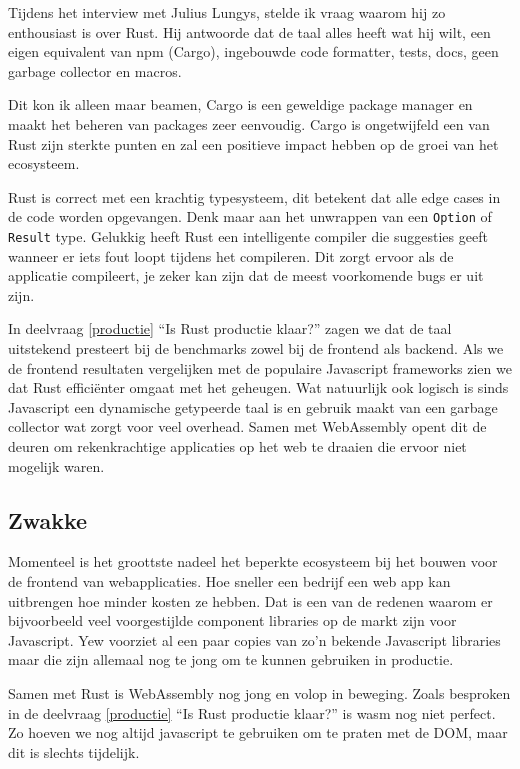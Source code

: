 Tijdens het interview met Julius Lungys, stelde ik vraag waarom hij zo enthousiast is over Rust. 
Hij antwoorde dat de taal alles heeft wat hij wilt, een eigen equivalent van npm (Cargo), ingebouwde
code formatter, tests, docs, geen garbage collector en macros.

Dit kon ik alleen maar beamen, Cargo is een geweldige package manager en maakt het beheren van
packages zeer eenvoudig. Cargo is ongetwijfeld een van Rust zijn sterkte punten en zal een positieve
impact hebben op de groei van het ecosysteem.

Rust is correct met een krachtig typesysteem, dit betekent dat alle edge cases in de code worden
opgevangen. Denk maar aan het unwrappen van een \texttt{Option} of
\texttt{Result} type. Gelukkig heeft Rust een intelligente compiler die suggesties geeft
wanneer er iets fout loopt tijdens het compileren. Dit zorgt ervoor als de applicatie compileert, je
zeker kan zijn dat de meest voorkomende bugs er uit zijn.

In deelvraag \ref{productie} \enquote{Is Rust productie klaar?} zagen we dat de taal uitstekend
presteert bij de benchmarks zowel bij de frontend als backend. Als we de frontend resultaten
vergelijken met de populaire Javascript frameworks zien we dat Rust efficiënter omgaat met het
geheugen. Wat natuurlijk ook logisch is sinds Javascript een dynamische getypeerde taal is en
gebruik maakt van een garbage collector wat zorgt voor veel overhead. Samen met WebAssembly opent
dit de deuren om rekenkrachtige applicaties op het web te draaien die ervoor niet mogelijk waren.

\subsection{Zwakke}

Momenteel is het groottste nadeel het beperkte ecosysteem bij het bouwen voor de frontend van
webapplicaties. Hoe sneller een bedrijf een web app kan uitbrengen hoe minder kosten ze hebben. Dat
is een van de redenen waarom er bijvoorbeeld veel voorgestijlde component libraries op de markt zijn
voor Javascript. Yew voorziet al een paar copies van zo'n bekende Javascript libraries maar die zijn
allemaal nog te jong om te kunnen gebruiken in productie.

Samen met Rust is WebAssembly nog jong en volop in beweging. Zoals besproken in de deelvraag
\ref{productie} \enquote{Is Rust productie klaar?} is wasm nog niet perfect. Zo hoeven we nog altijd
javascript te gebruiken om te praten met de DOM, maar dit is slechts tijdelijk.


